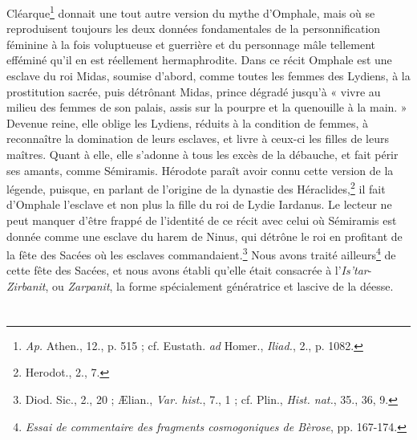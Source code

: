 \documentclass[a4paper, 11pt, oneside]{article}
\begin{document}
Cléarque\footnote{\emph{Ap.} Athen., 12., p. 515 ; cf. Eustath. \emph{ad} Homer., \emph{Iliad.}, 2., p. 1082.} donnait une tout autre version du mythe d'Omphale, mais où se reproduisent toujours les deux données fondamentales de la personnification féminine à la fois voluptueuse et guerrière et du personnage mâle tellement efféminé qu'il en est réellement hermaphrodite. Dans ce récit Omphale est une esclave du roi Midas, soumise d'abord, comme toutes les femmes des Lydiens, à la prostitution sacrée, puis détrônant Midas, prince dégradé jusqu'à « vivre au milieu des femmes de son palais, assis sur la pourpre et la quenouille à la main. » Devenue reine, elle oblige les Lydiens, réduits à la condition de femmes, à reconnaître la domination de leurs esclaves, et livre à ceux-ci les filles de leurs maîtres. Quant à elle, elle s'adonne à tous les excès de la débauche, et fait périr ses amants, comme Sémiramis. Hérodote paraît avoir connu cette version de la légende, puisque, en parlant de l'origine de la dynastie des Héraclides,\footnote{Herodot., 2., 7.} il fait d'Omphale l'esclave et non plus la fille du roi de Lydie Iardanus. Le lecteur ne peut manquer d'être frappé de l'identité de ce récit avec celui où Sémiramis est donnée comme une esclave du harem de Ninus, qui détrône le roi en profitant de la fête des Sacées où les esclaves commandaient.\footnote{Diod. Sic., 2., 20 ; Ælian., \emph{Var. hist.}, 7., 1 ; cf. Plin., \emph{Hist. nat.}, 35., 36, 9.} Nous avons traité ailleurs\footnote{\emph{Essai de commentaire des fragments cosmogoniques de Bèrose}, pp. 167-174.} de cette fête des Sacées, et nous avons établi qu'elle était consacrée à l'\emph{Is'tar}-\emph{Zirbanit}, ou \emph{Zarpanit}, la forme spécialement génératrice et lascive de la déesse.

\bigskip \centerline{\EightStarTaper} \centerline{\EightStarTaper\EightStarTaper} \bigskip\clearpage
\section{}
\end{document}
